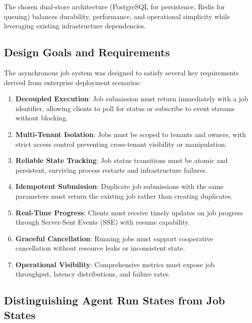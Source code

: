 \documentclass[a4paper,twoside]{sapthesis}
\begin{document}
The chosen dual-store architecture (PostgreSQL for persistence, Redis for queuing) balances durability, performance, and operational simplicity while leveraging existing infrastructure dependencies.

\subsection{Design Goals and Requirements}

The asynchronous job system was designed to satisfy several key requirements derived from enterprise deployment scenarios:

\begin{enumerate}
    \item \textbf{Decoupled Execution}: Job submission must return immediately with a job identifier, allowing clients to poll for status or subscribe to event streams without blocking.
    
    \item \textbf{Multi-Tenant Isolation}: Jobs must be scoped to tenants and owners, with strict access control preventing cross-tenant visibility or manipulation.
    
    \item \textbf{Reliable State Tracking}: Job status transitions must be atomic and persistent, surviving process restarts and infrastructure failures.
    
    \item \textbf{Idempotent Submission}: Duplicate job submissions with the same parameters must return the existing job rather than creating duplicates.
    
    \item \textbf{Real-Time Progress}: Clients must receive timely updates on job progress through Server-Sent Events (SSE) with resume capability.
    
    \item \textbf{Graceful Cancellation}: Running jobs must support cooperative cancellation without resource leaks or inconsistent state.
    
    \item \textbf{Operational Visibility}: Comprehensive metrics must expose job throughput, latency distributions, and failure rates.
\end{enumerate}

\subsection{Distinguishing Agent Run States from Job States}
\end{document}
